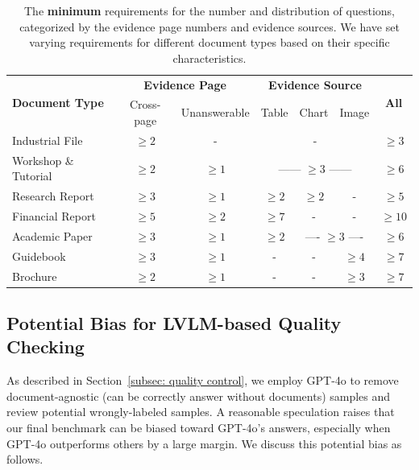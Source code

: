 \begin{table}[!htbp]
    \centering
        \begin{tabular}{l|cc|ccc|c}
        \toprule
        \multirow{2}{*}{\textbf{Document Type}}  &  \multicolumn{2}{c}{\textbf{Evidence Page}}  & \multicolumn{3}{c}{\textbf{Evidence Source}} & \multirow{2}{*}{\textbf{All}} \\
        & Cross-page & Unanswerable & Table & Chart & Image \\
        \midrule
        Industrial File & $\geq 2$ & - & \multicolumn{3}{c}{-} \vline & $\geq 3$ \\
        Workshop \& Tutorial & $\geq 2$  & $\geq 1$ & \multicolumn{3}{c}{------ $\geq 3$ ------} \vline & $\geq 6$  \\
        Research Report &  $\geq 3$ & $\geq 1$ & $\geq 2$ & $\geq 2$ & - & $\geq 5$ \\
        Financial Report &  $\geq 5$ & $\geq 2$ & $\geq 7$ & - & - & $\geq 10$ \\
        Academic Paper &  $\geq 3$ & $\geq 1$ & $\geq 2$ & \multicolumn{2}{c}{---- $\geq 3$ ----} \vline & $\geq 6$ \\
        Guidebook & $\geq 3$ & $\geq 1$ & -& - & $\geq 4$ & $\geq 7$ \\ 
        Brochure & $\geq 2$ & $\geq 1$ & -& - & $\geq 3$ & $\geq 7$ \\
        \bottomrule
        \end{tabular}
    \vspace{0.5em}
    \caption{The \textbf{minimum} requirements for the number and distribution of questions, categorized by the evidence page numbers and evidence sources. We have set varying requirements for different document types based on their specific characteristics.}
    \label{tab:my_label}
\end{table}

\subsection{Potential Bias for LVLM-based Quality Checking}
\label{appendix: potential_bias}
As described in Section~\ref{subsec: quality control}, we employ GPT-4o to remove document-agnostic (\ie can be correctly answer without documents) samples and review potential wrongly-labeled samples. A reasonable speculation raises that our final benchmark can be biased toward GPT-4o’s answers, especially when GPT-4o outperforms others by a large margin. We discuss this potential bias as follows. 

